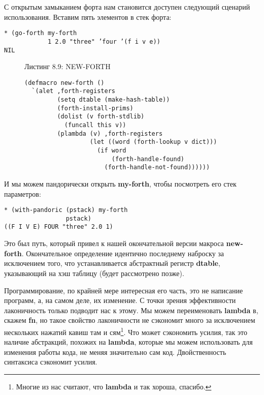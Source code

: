 С открытым замыканием форта нам становится доступен следующий сценарий использования. Вставим пять элементов в стек форта:

\begin{verbatim}
* (go-forth my-forth
            1 2.0 "three" ’four ’(f i v e))
NIL
\end{verbatim}

\begin{figure}Листинг 8.9: NEW-FORTH\label{listing_8.9}
\listbegin
\begin{verbatim}
(defmacro new-forth ()
  `(alet ,forth-registers
         (setq dtable (make-hash-table))
         (forth-install-prims)
         (dolist (v forth-stdlib)
           (funcall this v))
         (plambda (v) ,forth-registers
                  (let ((word (forth-lookup v dict)))
                    (if word
                        (forth-handle-found)
                      (forth-handle-not-found))))))
\end{verbatim}
  \listend
\end{figure}

И мы можем пандорически открыть \textbf{my-forth}, чтобы посмотреть его стек параметров:

\begin{verbatim}
* (with-pandoric (pstack) my-forth
                 pstack)
((F I V E) FOUR "three" 2.0 1)
\end{verbatim}

Это был путь, который привел к нашей окончательной версии макроса \textbf{new-forth}. Окончательное определение идентично последнему наброску за исключением того, что устанавливается абстрактный регистр \textbf{dtable}, указывающий на хэш таблицу (будет рассмотрено позже).

Программирование, по крайней мере интересная его часть, это не написание программ, а, на самом деле, их изменение. С точки зрения эффективности лаконичность только подводит нас к этому. Мы можем переименовать \textbf{lambda} в, скажем \textbf{fn}, но такое свойство лаконичности не сэкономит много за исключением нескольких нажатий кавиш там и сям\footnote{Многие из нас считают, что \textbf{lambda} и так хороша, спасибо.}. Что может сэкономить усилия, так это наличие абстракций, похожих на \textbf{lambda}, которые мы можем использовать для изменения работы кода, не меняя значительно сам код. Двойственность синтаксиса сэкономит усилия. 

